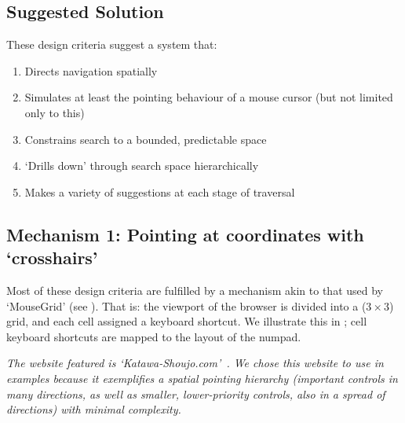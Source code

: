 \documentclass[11pt,openright,a4paper]{report}
\begin{document}

\subsection{Suggested Solution}
These design criteria suggest a system that:

\newcommand{\designcriteria}{\begin{enumerate}
	\item Directs navigation spatially
	\item Simulates at least the pointing behaviour of a mouse cursor (but not limited only to this)
	\item Constrains search to a bounded, predictable space
	\item `Drills down' through search space hierarchically 
	\item Makes a variety of suggestions at each stage of traversal
\end{enumerate}}
\designcriteria

\subsection{Mechanism 1: Pointing at coordinates with `crosshairs'}
\label{sec:ourmousegrid}
Most of these design criteria are fulfilled by a mechanism akin to that used by `MouseGrid' (see ).
That is: the viewport of the browser is divided into a ($3\times3$) grid, and each cell assigned a keyboard shortcut. We illustrate this in ; cell keyboard shortcuts are mapped to the layout of the numpad.

\textit{The website featured is `Katawa-Shoujo.com'~\cite{katawashoujo}. We chose this website to use in examples because it exemplifies a spatial pointing hierarchy (important controls in many directions, as well as smaller, lower-priority controls, also in a spread of directions) with minimal complexity.}
\end{document}

